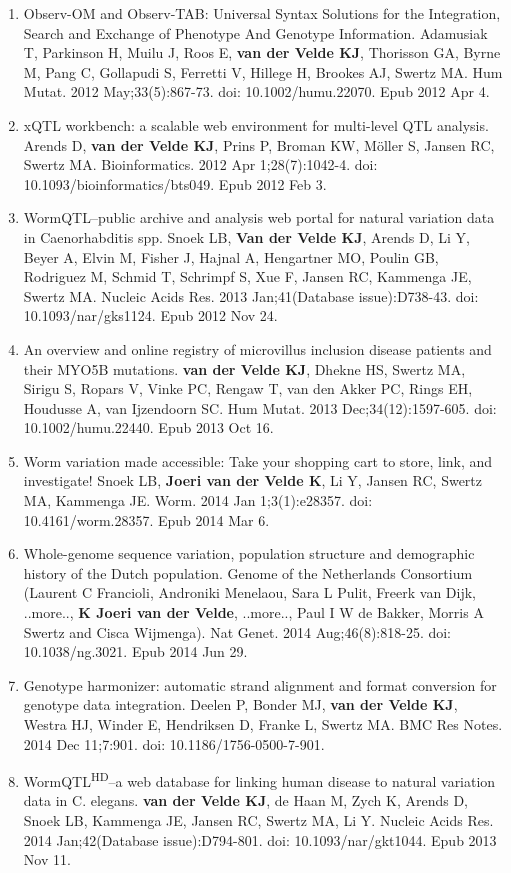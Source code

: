 \begin{appendices}
\begin{enumerate}
\item Observ-OM and Observ-TAB: Universal Syntax Solutions for the Integration, Search and Exchange of Phenotype And Genotype Information. Adamusiak T, Parkinson H, Muilu J, Roos E, \textbf{van der Velde KJ}, Thorisson GA, Byrne M, Pang C, Gollapudi S, Ferretti V, Hillege H, Brookes AJ, Swertz MA. Hum Mutat. 2012 May;33(5):867-73. doi: 10.1002/humu.22070. Epub 2012 Apr 4.
\item xQTL workbench: a scalable web environment for multi-level QTL analysis. Arends D, \textbf{van der Velde KJ}, Prins P, Broman KW, Möller S, Jansen RC, Swertz MA. Bioinformatics. 2012 Apr 1;28(7):1042-4. doi: 10.1093/bioinformatics/bts049. Epub 2012 Feb 3.
\item WormQTL--public archive and analysis web portal for natural variation data in Caenorhabditis spp. Snoek LB, \textbf{Van der Velde KJ}, Arends D, Li Y, Beyer A, Elvin M, Fisher J, Hajnal A, Hengartner MO, Poulin GB, Rodriguez M, Schmid T, Schrimpf S, Xue F, Jansen RC, Kammenga JE, Swertz MA. Nucleic Acids Res. 2013 Jan;41(Database issue):D738-43. doi: 10.1093/nar/gks1124. Epub 2012 Nov 24.
\item An overview and online registry of microvillus inclusion disease patients and their MYO5B mutations. \textbf{van der Velde KJ}, Dhekne HS, Swertz MA, Sirigu S, Ropars V, Vinke PC, Rengaw T, van den Akker PC, Rings EH, Houdusse A, van Ijzendoorn SC. Hum Mutat. 2013 Dec;34(12):1597-605. doi: 10.1002/humu.22440. Epub 2013 Oct 16.
\item Worm variation made accessible: Take your shopping cart to store, link, and investigate! Snoek LB, \textbf{Joeri van der Velde K}, Li Y, Jansen RC, Swertz MA, Kammenga JE. Worm. 2014 Jan 1;3(1):e28357. doi: 10.4161/worm.28357. Epub 2014 Mar 6.
\item Whole-genome sequence variation, population structure and demographic history of the Dutch population. Genome of the Netherlands Consortium (Laurent C Francioli, Androniki Menelaou, Sara L Pulit, Freerk van Dijk, ..more.., \textbf{K Joeri van der Velde}, ..more.., Paul I W de Bakker, Morris A Swertz and Cisca Wijmenga). Nat Genet. 2014 Aug;46(8):818-25. doi: 10.1038/ng.3021. Epub 2014 Jun 29.
\item Genotype harmonizer: automatic strand alignment and format conversion for genotype data integration. Deelen P, Bonder MJ, \textbf{van der Velde KJ}, Westra HJ, Winder E, Hendriksen D, Franke L, Swertz MA. BMC Res Notes. 2014 Dec 11;7:901. doi: 10.1186\-/1756-0500-7-901.
\item WormQTL\textsuperscript{HD}--a web database for linking human disease to natural variation data in C. elegans. \textbf{van der Velde KJ}, de Haan M, Zych K, Arends D, Snoek LB, Kammenga JE, Jansen RC, Swertz MA, Li Y. Nucleic Acids Res. 2014 Jan;42(Database issue):D794-801. doi: 10.1093/nar/gkt1044. Epub 2013 Nov 11.

\end{enumerate}
\end{appendices}
